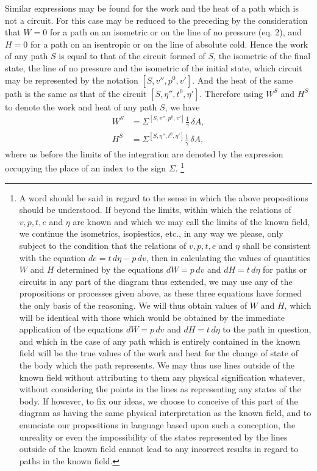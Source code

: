 \documentclass[11pt]{article}
\begin{document}
Similar expressions may be found for the work and the heat of a path which is not a circuit. For this case may be reduced to the preceding by the consideration that $W=0$ for a path on an isometric or on the line of no pressure (eq. 2), and $H=0$ for a path on an isentropic or on the line of absolute cold. Hence the work of any path $S$ is equal to that of the circuit formed of $S$, the isometric of the final state, the line of no pressure and the isometric of the initial state, which circuit may be represented by the notation $[S,v'',p^0,v']$. And the heat of the same path is the same as that of the circuit $[S,\eta'',t^0,\eta']$. Therefore using $W^S$ and $H^S$ to denote the work and heat of any path $S$, we have
\begin{align}
W^S&=\Sigma^{[S,v'',p^0,v']}\frac1\gamma\,\delta A, \tag{9}\\
H^S&=\Sigma^{[S,\eta'',t^0,\eta']}\frac1\gamma\,\delta A, \tag{10}
\end{align}
where as before the limits of the integration are denoted by the expression occupying the place of an index to the sign $\Sigma$.
\footnote{A word should be said in regard to the sense in which the above propositions should be understood. If beyond the limits, within which the relations of $v,p,t,e$ and $\eta$ are known and which we may call the limits of the known field, we continue the isometrics, isopiestics, etc., in any way we please, only subject to the condition that the relations of $v,p,t,e$ and $\eta$ shall be consistent with the equation $de=t\,d\eta-p\,dv$, then in calculating the values of quantities $W$ and $H$ determined by the equations $dW=p\,dv$ and $dH=t\,d\eta$ for paths or circuits in any part of the diagram thus extended, we may use any of the propositions or processes given above, as these three equations have formed the only basis of the reasoning. We will thus obtain values of $W$ and $H$, which will be identical with those which would be obtained by the immediate application of the equations $dW=p\,dv$ and $dH=t\,d\eta$ to the path in question, and which in the case of any path which is entirely contained in the known field will be the true values of the work and heat for the change of state of the body which the path represents. We may thus use lines outside of the known field without attributing to them any physical signification whatever, without considering the points in the lines as representing any states of the body. If however, to fix our ideas, we choose to conceive of this part of the diagram as having the same physical interpretation as the known field, and to enunciate our propositions in language based upon such a conception, the unreality or even the impossibility of the states represented by the lines outside of the known field cannot lead to any incorrect results in regard to paths in the known field.}
\end{document}
